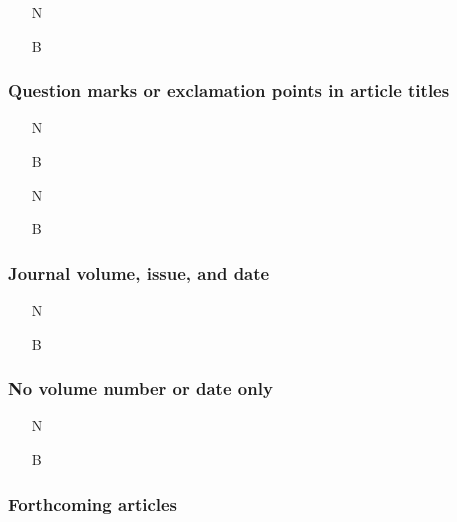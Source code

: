 \documentclass[11pt,letterpaper,oneside]{article}
\begin{document}
\begin{itemize}
\item[N] 

\item[B] 
\end{itemize}

\setcounter{subsubsection}{177}
\subsubsection{Question marks or exclamation points in article titles}

\begin{itemize}
\item[N] 

\item[B] 

\item[N] 

\item[B] 
\end{itemize}

\setcounter{subsubsection}{179}
\subsubsection{Journal volume, issue, and date}

\begin{itemize}
\item[N] 

\item[B] 
\end{itemize}

\setcounter{subsubsection}{180}
\subsubsection{No volume number or date only}

\begin{itemize}
\item[N] 

\item[B] 
\end{itemize}

\subsubsection{Forthcoming articles}
\end{document}
